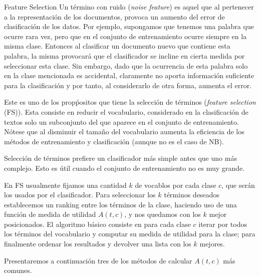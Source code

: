 \documentclass{llncs}
\begin{document}
	
	\begin{subsection}{Feature Selection}
		Un t\'ermino con ruido (\emph{noise feature}) es aquel que al pertenecer a la representaci\'on de los documentos, provoca un aumento del error de clasificaci\'on de los datos. Por ejemplo, supongamos que tenemos una palabra que ocurre rara vez, pero que en el conjunto de entrenamiento ocurre siempre en la misma clase. Entonces al clasificar un documento nuevo que contiene esta palabra, la misma provocar\'a que el clasificador se incline en cierta medida por seleccionar esta clase. Sin embargo, dado que la ocurrencia de esta palabra solo en la clase mencionada es accidental, claramente no aporta informaci\'on suficiente para la clasificaci\'on y por tanto, al considerarlo de otra forma, aumenta el error.
		
		Este es uno de los prop\'positos que tiene la selecci\'on de t\'erminos (\emph{feature selection} (FS)). Esta consiste en reducir el vocabulario, considerado en la clasificaci\'on de textos solo un subconjunto del que aparece en el conjunto de entrenamiento. N\'otese que al disminuir el tama\~no del vocabulario aumenta la eficiencia de los m\'etodos de entrenamiento y clasificaci\'on (aunque no es el caso de NB).
		
		Selecci\'on de t\'erminos prefiere un clasificador m\'as simple antes que uno m\'as complejo. Esto es \'util cuando el conjunto de entrenamiento no es muy grande.
		

		 En FS usualmente fijamos una cantidad $k$ de vocablos por cada clase $c$, que ser\'an los usados por el clasificador. Para seleccionar los $k$ t\'erminos deseados establecemos un ranking entre los t\'erminos de la clase, haciendo uso de una funci\'on de medida de utilidad $A(t,c)$, y nos quedamos con los $k$ mejor posicionados. El algoritmo b\'asico consiste en para cada clase $c$ iterar por todos los t\'erminos del vocabulario y computar su medida de utilidad para la clase; para finalmente ordenar los resultados y devolver una lista con los $k$ mejores.
		 
		 Presentaremos a continuaci\'on tres de los m\'etodos de calcular $A(t,c)$ m\'as comunes.
		

\end{subsection}
\end{document}
